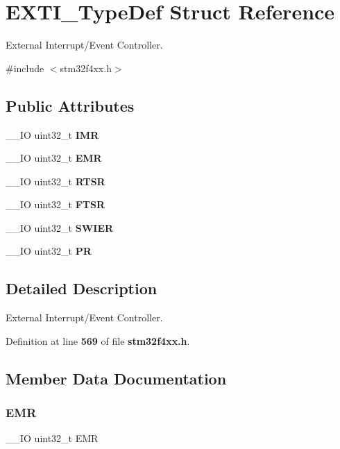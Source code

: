\section{E\+X\+T\+I\+\_\+\+Type\+Def Struct Reference}
\label{structEXTI__TypeDef}


External Interrupt/\+Event Controller.  




{\ttfamily \#include $<$stm32f4xx.\+h$>$}

\subsection*{Public Attributes}
\begin{DoxyCompactItemize}
\item 
\+\_\+\+\_\+\+IO uint32\+\_\+t \textbf{ I\+MR}
\item 
\+\_\+\+\_\+\+IO uint32\+\_\+t \textbf{ E\+MR}
\item 
\+\_\+\+\_\+\+IO uint32\+\_\+t \textbf{ R\+T\+SR}
\item 
\+\_\+\+\_\+\+IO uint32\+\_\+t \textbf{ F\+T\+SR}
\item 
\+\_\+\+\_\+\+IO uint32\+\_\+t \textbf{ S\+W\+I\+ER}
\item 
\+\_\+\+\_\+\+IO uint32\+\_\+t \textbf{ PR}
\end{DoxyCompactItemize}


\subsection{Detailed Description}
External Interrupt/\+Event Controller. 

Definition at line \textbf{ 569} of file \textbf{ stm32f4xx.\+h}.



\subsection{Member Data Documentation}
\mbox{\label{structEXTI__TypeDef_a6034c7458d8e6030f6dacecf0f1a3a89}} 
\subsubsection{E\+MR}
{\footnotesize\ttfamily \+\_\+\+\_\+\+IO uint32\+\_\+t E\+MR}

